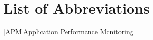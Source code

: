 \chapter*{List of Abbreviations} 

\begin{acronym}
	
	[APM]{Application Performance Monitoring}
	
\end{acronym}